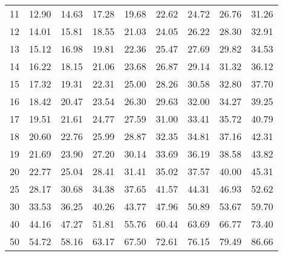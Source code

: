 \begin{center}
\begin{tabular}{r | rrrr | rrrr |}
  \hline
  11 & \footnotesize \footnotesize 12.90 & \footnotesize 14.63 & \footnotesize 17.28 & \footnotesize 19.68 & \footnotesize 22.62 & \footnotesize 24.72 & \footnotesize 26.76 & \footnotesize 31.26 \\ 
  12 & \footnotesize 14.01 & \footnotesize 15.81 & \footnotesize 18.55 & \footnotesize 21.03 & \footnotesize 24.05 & \footnotesize 26.22 & \footnotesize 28.30 & \footnotesize 32.91 \\ 
  13 & \footnotesize 15.12 & \footnotesize 16.98 & \footnotesize 19.81 & \footnotesize 22.36 & \footnotesize 25.47 & \footnotesize 27.69 & \footnotesize 29.82 & \footnotesize 34.53 \\ 
  14 & \footnotesize 16.22 & \footnotesize 18.15 & \footnotesize 21.06 & \footnotesize 23.68 & \footnotesize 26.87 & \footnotesize 29.14 & \footnotesize 31.32 & \footnotesize 36.12 \\ 
  15 & \footnotesize 17.32 & \footnotesize 19.31 & \footnotesize 22.31 & \footnotesize 25.00 & \footnotesize 28.26 & \footnotesize 30.58 & \footnotesize 32.80 & \footnotesize 37.70 \\ 
  \hline
  16 & \footnotesize 18.42 & \footnotesize 20.47 & \footnotesize 23.54 & \footnotesize 26.30 & \footnotesize 29.63 & \footnotesize 32.00 & \footnotesize 34.27 & \footnotesize 39.25 \\ 
  17 & \footnotesize 19.51 & \footnotesize 21.61 & \footnotesize 24.77 & \footnotesize 27.59 & \footnotesize 31.00 & \footnotesize 33.41 & \footnotesize 35.72 & \footnotesize 40.79 \\ 
  18 & \footnotesize 20.60 & \footnotesize 22.76 & \footnotesize 25.99 & \footnotesize 28.87 & \footnotesize 32.35 & \footnotesize 34.81 & \footnotesize 37.16 & \footnotesize 42.31 \\ 
  19 & \footnotesize 21.69 & \footnotesize 23.90 & \footnotesize 27.20 & \footnotesize 30.14 & \footnotesize 33.69 & \footnotesize 36.19 & \footnotesize 38.58 & \footnotesize 43.82 \\ 
  20 & \footnotesize 22.77 & \footnotesize 25.04 & \footnotesize 28.41 & \footnotesize 31.41 & \footnotesize 35.02 & \footnotesize 37.57 & \footnotesize 40.00 & \footnotesize 45.31 \\ 
  \hline
  25 & \footnotesize 28.17 & \footnotesize 30.68 & \footnotesize 34.38 & \footnotesize 37.65 & \footnotesize 41.57 & \footnotesize 44.31 & \footnotesize 46.93 & \footnotesize 52.62 \\ 
  30 & \footnotesize 33.53 & \footnotesize 36.25 & \footnotesize 40.26 & \footnotesize 43.77 & \footnotesize 47.96 & \footnotesize 50.89 & \footnotesize 53.67 & \footnotesize 59.70 \\ 
  40 & \footnotesize 44.16 & \footnotesize 47.27 & \footnotesize 51.81 & \footnotesize 55.76 & \footnotesize 60.44 & \footnotesize 63.69 & \footnotesize 66.77 & \footnotesize 73.40 \\ 
  50 & \footnotesize 54.72 & \footnotesize 58.16 & \footnotesize 63.17 & \footnotesize 67.50 & \footnotesize 72.61 & \footnotesize 76.15 & \footnotesize 79.49 & \footnotesize 86.66 \\ 
  \hline
\end{tabular}
\end{center}
